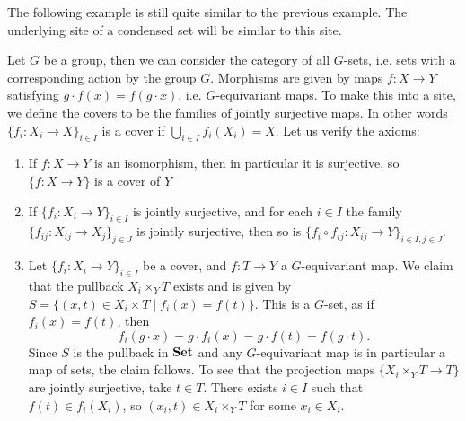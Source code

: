 \documentclass{article}
\begin{document}
The following example is still quite similar to the previous
example. The underlying site of a condensed set will be similar
to this site.
\begin{example}
    Let $G$ be a group, then we can consider the category
    of all $G$-sets, i.e. sets with a corresponding action
    by the group $G$. Morphisms are given by maps $f \colon X \to Y$
    satisfying $g\cdot f(x) = f(g\cdot x)$, i.e. $G$-equivariant
    maps. To make this into a site, we define the covers to be the
    families of jointly surjective maps. In other words
    $\{f_i \colon X_i \to X\}_{i\in I}$ is a cover if
    $\bigcup_{i\in I}f_i(X_i) = X$. Let us verify the axioms:
    \begin{enumerate}
        \item If $f \colon X \to Y$ is an isomorphism, then
              in particular it is surjective, so $\{f \colon X \to Y\}$ is a cover
              of $Y$
        \item If $\{f_i \colon X_i \to Y\}_{i\in I}$ is jointly surjective, and
              for each $i\in I$ the family $\{f_{ij} \colon X_{ij} \to X_j\}_{j\in J}$ is jointly
              surjective, then so is $\{f_i \circ f_{ij}\colon X_{ij} \to Y\}_{i\in I, j\in J}$.
        \item Let $\{f_i \colon X_i \to Y\}_{i\in I}$ be a cover,
              and $f\colon T \to Y$ a $G$-equivariant map. We claim that the pullback
              $X_i \times_Y T$ exists and is given by
              $S = \{(x,t)\in X_i \times T \mid f_i(x) = f(t)\}$.
              This is a $G$-set, as if $f_i(x) = f(t)$, then
              \begin{equation*}
                  f_i(g\cdot x) = g\cdot f_i(x) = g\cdot f(t) = f(g \cdot t).
              \end{equation*}
              Since $S$ is the pullback in $\operatorname{\mathbf{Set}}$ and any $G$-equivariant map
              is in particular a map of sets, the claim follows.
              To see that the projection maps $\{X_i \times_Y T \to T\}$
              are jointly surjective, take $t\in T$. There exists $i\in I$
              such that $f(t) \in f_i(X_i)$, so $(x_i, t) \in X_i \times_Y T$
              for some $x_i \in X_i$.
    \end{enumerate}
\end{example}
\end{document}
